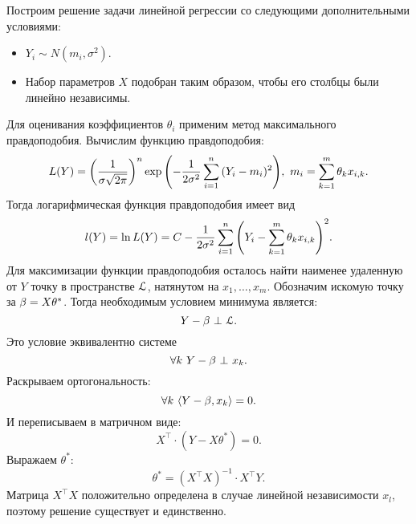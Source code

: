 Построим решение задачи линейной регрессии со следующими дополнительными
условиями:
\begin{itemize}
    \item $Y_i \sim N(m_i, \sigma^2)$.
    \item Набор параметров $X$ подобран таким образом, чтобы его столбцы
        были линейно независимы.
\end{itemize}

Для оценивания коэффициентов $\theta_i$ применим метод максимального
правдоподобия. Вычислим функцию правдоподобия:
\[
    L(Y) = \parens*{\frac{1}{\sigma \sqrt{2 \pi}}}^n \exp
    {\parens*{-\frac{1}{2 \sigma^2} \sum_{i = 1}^{n}{(Y_i - m_i)^2}}},~
    m_i = \sum_{k = 1}^{m}{\theta_k x_{i, k}}
.\]
Тогда логарифмическая функция правдоподобия имеет вид
\[
    l(Y) = \ln{L(Y)} = C - \frac{1}{2 \sigma^2} \sum_{i = 1}^{n}
    {\parens*{Y_i - \sum_{k = 1}^m{\theta_k x_{i, k}}}^2}
.\]
Для максимизации функции правдоподобия осталось найти наименее удаленную от $Y$
точку в пространстве $\cL$, натянутом на $x_1, \ldots, x_m$. Обозначим
искомую точку за $\b = X \theta^*$. Тогда необходимым условием минимума является:
\[
    Y - \b ~\bot~ \cL
.\]
Это условие эквивалентно системе
\[
    \forall k~ Y - \b ~\bot~ x_k
.\]
Раскрываем ортогональность:
\[
    \forall k~ \scp{Y - \b}{x_k} = 0
.\]
И переписываем в матричном виде:
\[
    X^{\top} \cdot (Y - X \theta^*) = 0
.\]
Выражаем $\theta^*$:
\[
    \theta^* = (X^{\top} X)^{-1} \cdot X^\top Y
.\]
Матрица $X^\top X$ положительно определена в случае линейной независимости
$x_l$, поэтому решение существует и единственно.

